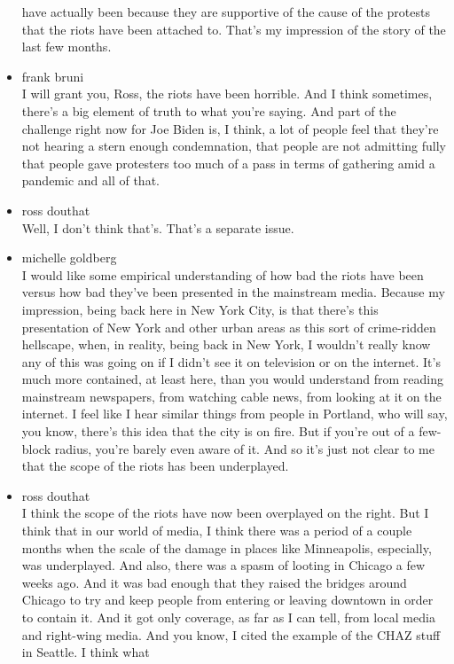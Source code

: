 \begin{itemize}
  have actually been because they are supportive of the cause of the
  protests that the riots have been attached to. That's my impression of
  the story of the last few months.
\item
  frank bruni\\
  I will grant you, Ross, the riots have been horrible. And I think
  sometimes, there's a big element of truth to what you're saying. And
  part of the challenge right now for Joe Biden is, I think, a lot of
  people feel that they're not hearing a stern enough condemnation, that
  people are not admitting fully that people gave protesters too much of
  a pass in terms of gathering amid a pandemic and all of that.
\item
  ross douthat\\
  Well, I don't think that's. That's a separate issue.
\item
  michelle goldberg\\
  I would like some empirical understanding of how bad the riots have
  been versus how bad they've been presented in the mainstream media.
  Because my impression, being back here in New York City, is that
  there's this presentation of New York and other urban areas as this
  sort of crime-ridden hellscape, when, in reality, being back in New
  York, I wouldn't really know any of this was going on if I didn't see
  it on television or on the internet. It's much more contained, at
  least here, than you would understand from reading mainstream
  newspapers, from watching cable news, from looking at it on the
  internet. I feel like I hear similar things from people in Portland,
  who will say, you know, there's this idea that the city is on fire.
  But if you're out of a few-block radius, you're barely even aware of
  it. And so it's just not clear to me that the scope of the riots has
  been underplayed.
\item
  ross douthat\\
  I think the scope of the riots have now been overplayed on the right.
  But I think that in our world of media, I think there was a period of
  a couple months when the scale of the damage in places like
  Minneapolis, especially, was underplayed. And also, there was a spasm
  of looting in Chicago a few weeks ago. And it was bad enough that they
  raised the bridges around Chicago to try and keep people from entering
  or leaving downtown in order to contain it. And it got only coverage,
  as far as I can tell, from local media and right-wing media. And you
  know, I cited the example of the CHAZ stuff in Seattle. I think what

\end{itemize}
